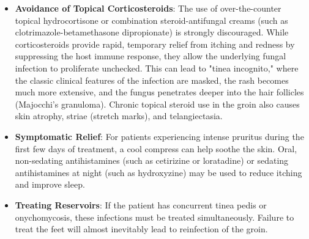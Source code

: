 \begin{itemize}
    \begin{itemize}
        \item \textbf{Terbinafine}: The oral agent of choice due to its high efficacy and fungicidal activity. The standard adult dose is 250 mg orally once daily for 2 to 4 weeks. Because terbinafine is metabolized by the liver, baseline liver function tests (LFTs) should be checked, and patients should be monitored for rare side effects like hepatotoxicity, taste disturbances, or neutropenia.
        \item \textbf{Itraconazole}: An alternative oral agent. The standard dose is 100 to 200 mg orally daily for 1 to 2 weeks, or a pulse regimen of 400 mg daily for one week. Itraconazole is a potent inhibitor of the cytochrome P450 3A4 (CYP3A4) enzyme system and has numerous significant drug-drug interactions. It also carries a black box warning for patients with heart failure due to its negative inotropic effects.
        \item \textbf{Fluconazole}: Can be prescribed at a dose of 150 to 200 mg orally once weekly for 2 to 4 weeks.
    \end{itemize}
    \item \textbf{Avoidance of Topical Corticosteroids}: The use of over-the-counter topical hydrocortisone or combination steroid-antifungal creams (such as clotrimazole-betamethasone dipropionate) is strongly discouraged. While corticosteroids provide rapid, temporary relief from itching and redness by suppressing the host immune response, they allow the underlying fungal infection to proliferate unchecked. This can lead to "tinea incognito," where the classic clinical features of the infection are masked, the rash becomes much more extensive, and the fungus penetrates deeper into the hair follicles (Majocchi's granuloma). Chronic topical steroid use in the groin also causes skin atrophy, striae (stretch marks), and telangiectasia.
    \item \textbf{Symptomatic Relief}: For patients experiencing intense pruritus during the first few days of treatment, a cool compress can help soothe the skin. Oral, non-sedating antihistamines (such as cetirizine or loratadine) or sedating antihistamines at night (such as hydroxyzine) may be used to reduce itching and improve sleep.
    \item \textbf{Treating Reservoirs}: If the patient has concurrent tinea pedis or onychomycosis, these infections must be treated simultaneously. Failure to treat the feet will almost inevitably lead to reinfection of the groin.
\end{itemize}

